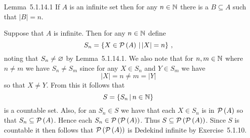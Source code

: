 
\begin{solution}
    \begin{statement}{Lemma~5.1.14.1}
        If $A$ is an infinite set then for any $n \in \mathbb{N}$ there is a $B \subseteq A$ such that $|B| = n$.
    \end{statement}


    \mainprob
    
    Suppose that $A$ is infinite.
    Then for any $n \in \mathbb{N}$ define
    $$
    S_n = \left\{ X \in \mathcal{P}\left(A\right) \,|\, |X| = n \right\} \,,
    $$
    noting that $S_n \neq \varnothing$ by Lemma~5.1.14.1.
    We also note that for $n,m \in \mathbb{N}$ where $n \neq m$ we have $S_n \neq S_m$ since for any $X \in S_n$ and $Y \in S_m$ we have
    $$
    |X| = n \neq m = |Y|
    $$
    so that $X \neq Y$.
    From this it follows that
    $$
    S = \left\{ S_n \,|\, n \in \mathbb{N} \right\}
    $$
    is a countable set.
    Also, for an $S_n \in S$ we have that each $X \in S_n$ is in $\mathcal{P}\left(A\right)$ so that $S_n \subseteq \mathcal{P}\left(A\right)$.
    Hence each $S_n \in \mathcal{P}\left(\mathcal{P}\left(A\right)\right)$.
    Thus $S \subseteq \mathcal{P}\left(\mathcal{P}\left(A\right)\right)$.
    Since $S$ is countable it then follows that $\mathcal{P}\left(\mathcal{P}\left(A\right)\right)$ is Dedekind infinite by Exercise~5.1.10.
\end{solution}

